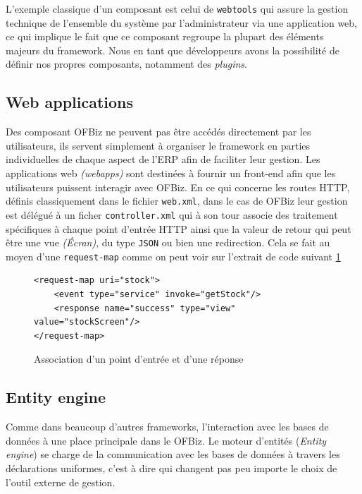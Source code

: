 L'exemple classique d'un composant est celui de \verb|webtools| qui assure la gestion technique de l'ensemble du système par l'administrateur via une application web, ce qui implique le fait que ce composant regroupe la plupart des éléments majeurs du framework.
Nous en tant que développeurs avons la possibilité de définir nos propres composants, notamment des \emph{plugins}. 
  


\subsection{Web applications}
Des composant OFBiz ne peuvent pas être accédés directement par les utilisateurs, ils servent simplement à organiser le framework en parties individuelles de chaque aspect de l'ERP afin de faciliter leur gestion. Les applications web \emph{(webapps)} sont destinées à fournir un front-end afin que les utilisateurs puissent interagir avec OFBiz. En ce qui concerne les routes HTTP, définis classiquement dans le fichier \verb|web.xml|, dans le cas de OFBiz leur gestion est délégué à un ficher \verb|controller.xml| qui à son tour associe des traitement spécifiques à chaque point d'entrée HTTP ainsi que la valeur de retour qui peut être une vue \emph{(Écran)}, du type \verb|JSON| ou bien une redirection. Cela se fait au moyen d'une \verb|request-map| comme on peut voir sur l'extrait de code suivant \ref{reqmap}



\lstset{language=XML}
\begin{figure}
\begin{lstlisting}[frame=leftline]
<request-map uri="stock">
    <event type="service" invoke="getStock"/>
    <response name="success" type="view" value="stockScreen"/>
</request-map>
\end{lstlisting}
	\caption{Association d'un point d'entrée et d'une réponse}
\label{reqmap}
\end{figure}



\subsection{Entity engine}
Comme dans beaucoup d'autres frameworks, l'interaction avec les bases de données à une place principale dans le OFBiz. Le moteur d'entités (\emph{Entity engine}) se charge de la communication avec les  bases de données à travers les déclarations uniformes, c'est à dire qui changent pas peu importe le choix de l'outil externe de gestion.



